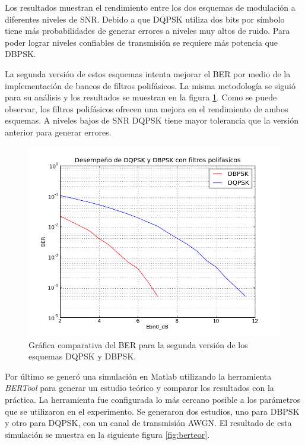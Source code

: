 Los resultados muestran el rendimiento entre los dos esquemas de modulaci\'on a diferentes niveles
de SNR. Debido a que DQPSK utiliza dos bits por s\'imbolo tiene m\'as probabilidades de generar
errores a niveles muy altos de ruido. Para poder lograr niveles confiables de transmisi\'on se
requiere m\'as potencia que DBPSK.

La segunda versi\'on de estos esquemas intenta mejorar el BER por medio de la implementaci\'on de
bancos de filtros polif\'asicos. La misma metodolog\'ia se sigui\'o para su an\'alisis y los
resultados se muestran en la figura \ref{fig:berpoly}. Como se puede observar, los filtros
polif\'asicos ofrecen una mejora en el rendimiento de ambos esquemas. A niveles bajos de SNR DQPSK
tiene mayor tolerancia que la versi\'on anterior para generar errores. 

\begin{figure}[t]
  \centering
  \includegraphics[scale=0.7]{figs/berpoly}
  \caption{Gr\'afica comparativa del BER para la segunda versi\'on de los esquemas DQPSK y DBPSK.}
  \label{fig:berpoly}
\end{figure}

Por \'ultimo se gener\'o una simulaci\'on en Matlab utilizando la herramienta \emph{BERTool} para generar un estudio te\'orico y
comparar los resultados con la pr\'actica. La herramienta fue configurada lo m\'as cercano posible a los par\'ametros que se
utilizaron en el experimento. Se generaron dos estudios, uno para DBPSK y otro para DQPSK, con un canal de transmisi\'on AWGN. El
resultado de esta simulaci\'on se muestra en la siguiente figura \ref{fig:berteor}.

